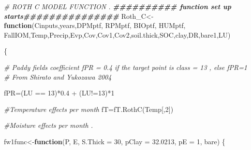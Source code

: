 \documentclass[
  10pt,
  b5paper,
]{book}
\newenvironment{Shaded}{\begin{snugshade}}{\end{snugshade}}
\newcommand{\AttributeTok}[1]{\textcolor[rgb]{0.77,0.63,0.00}{#1}}
\newcommand{\CommentTok}[1]{\textcolor[rgb]{0.56,0.35,0.01}{\textit{#1}}}
\newcommand{\ControlFlowTok}[1]{\textcolor[rgb]{0.13,0.29,0.53}{\textbf{#1}}}
\newcommand{\DecValTok}[1]{\textcolor[rgb]{0.00,0.00,0.81}{#1}}
\newcommand{\DocumentationTok}[1]{\textcolor[rgb]{0.56,0.35,0.01}{\textbf{\textit{#1}}}}
\newcommand{\FloatTok}[1]{\textcolor[rgb]{0.00,0.00,0.81}{#1}}
\newcommand{\FunctionTok}[1]{\textcolor[rgb]{0.00,0.00,0.00}{#1}}
\newcommand{\NormalTok}[1]{#1}
\newcommand{\OtherTok}[1]{\textcolor[rgb]{0.56,0.35,0.01}{#1}}
\newcommand{\SpecialCharTok}[1]{\textcolor[rgb]{0.00,0.00,0.00}{#1}}
\begin{document}
\begin{Shaded}
\begin{Highlighting}[]
\CommentTok{\# ROTH C MODEL FUNCTION .}
\DocumentationTok{\#\#\#\#\#\#\#\#\#\# function set up starts\#\#\#\#\#\#\#\#\#\#\#\#\#\#\#}
\NormalTok{Roth\_C}\OtherTok{\textless{}{-}}\ControlFlowTok{function}\NormalTok{(Cinputs,years,DPMptf, RPMptf, BIOptf, HUMptf, FallIOM,Temp,Precip,Evp,Cov,Cov1,Cov2,soil.thick,SOC,clay,DR,bare1,LU)}

\NormalTok{\{}

\CommentTok{\# Paddy fields coefficient fPR = 0.4 if the target point is class = 13 , else fPR=1}
\CommentTok{\# From Shirato and Yukozawa 2004}

\NormalTok{fPR}\OtherTok{=}\NormalTok{(LU }\SpecialCharTok{==} \DecValTok{13}\NormalTok{)}\SpecialCharTok{*}\FloatTok{0.4} \SpecialCharTok{+}\NormalTok{ (LU}\SpecialCharTok{!=}\DecValTok{13}\NormalTok{)}\SpecialCharTok{*}\DecValTok{1}

\CommentTok{\#Temperature effects per month}
\NormalTok{fT}\OtherTok{=}\FunctionTok{fT.RothC}\NormalTok{(Temp[,}\DecValTok{2}\NormalTok{]) }

\CommentTok{\#Moisture effects per month . }

\NormalTok{fw1func}\OtherTok{\textless{}{-}}\ControlFlowTok{function}\NormalTok{(P, E, }\AttributeTok{S.Thick =} \DecValTok{30}\NormalTok{, }\AttributeTok{pClay =} \FloatTok{32.0213}\NormalTok{, }\AttributeTok{pE =} \DecValTok{1}\NormalTok{, bare) }
\NormalTok{\{}
   

\end{Highlighting}
\end{Shaded}
\end{document}

